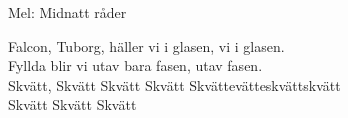 \begin{SongText}[Diurvisan]
    \begin{SongInfo}
        Mel: Midnatt råder
    \end{SongInfo}
    \begin{SongVerse}
        Falcon, Tuborg, häller vi i glasen, vi i glasen.\\%
        Fyllda blir vi utav bara fasen, utav fasen.\\%
        Skvätt, Skvätt Skvätt Skvätt Skvättevätteskvättskvätt\\%
        Skvätt Skvätt Skvätt
    \end{SongVerse}
\end{SongText}
